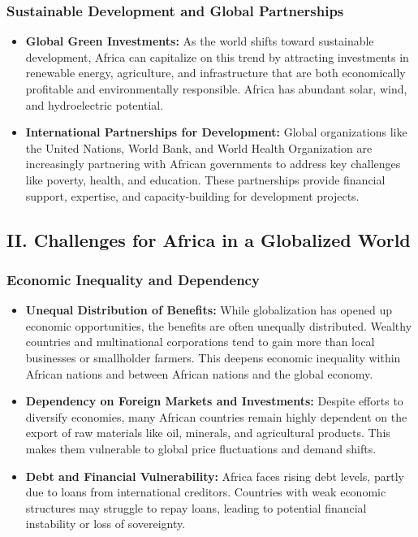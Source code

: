 \documentclass[10pt]{article}
\begin{document}
\subsubsection*{Sustainable Development and Global Partnerships}
\begin{itemize}
  \item \textbf{Global Green Investments:} As the world shifts toward sustainable development,
    Africa can capitalize on this trend by attracting investments in renewable energy,
    agriculture, and infrastructure that are both economically profitable and
    environmentally responsible. Africa has abundant solar, wind, and hydroelectric
    potential.

  \item \textbf{International Partnerships for Development:} Global organizations like the
    United Nations, World Bank, and World Health Organization are increasingly
    partnering with African governments to address key challenges like poverty,
    health, and education. These partnerships provide financial support, expertise,
    and capacity-building for development projects.
\end{itemize}

\subsection*{II. Challenges for Africa in a Globalized World}

\subsubsection*{Economic Inequality and Dependency}
\begin{itemize}
  \item \textbf{Unequal Distribution of Benefits:} While globalization has opened up economic
    opportunities, the benefits are often unequally distributed. Wealthy countries
    and multinational corporations tend to gain more than local businesses or
    smallholder farmers. This deepens economic inequality within African nations
    and between African nations and the global economy.

  \item \textbf{Dependency on Foreign Markets and Investments:} Despite efforts to diversify
    economies, many African countries remain highly dependent on the export of
    raw materials like oil, minerals, and agricultural products. This makes them
    vulnerable to global price fluctuations and demand shifts.

  \item \textbf{Debt and Financial Vulnerability:} Africa faces rising debt levels, partly due to
    loans from international creditors. Countries with weak economic structures may
    struggle to repay loans, leading to potential financial instability or loss of
    sovereignty.
\end{itemize}
\end{document}
